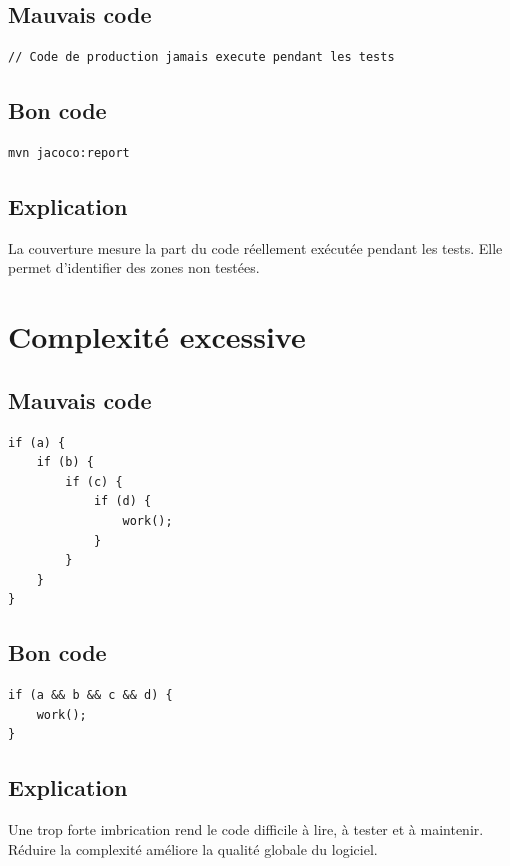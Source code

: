 \documentclass[a4paper,11pt]{report}
\begin{document}
\section{Mauvais code}
\begin{lstlisting}
// Code de production jamais execute pendant les tests
\end{lstlisting}

\section{Bon code}
\begin{lstlisting}[language=bash]
mvn jacoco:report
\end{lstlisting}

\section{Explication}
La couverture mesure la part du code réellement exécutée pendant les tests.
Elle permet d'identifier des zones non testées.

\chapter{Complexité excessive}

\section{Mauvais code}
\begin{lstlisting}
if (a) {
    if (b) {
        if (c) {
            if (d) {
                work();
            }
        }
    }
}
\end{lstlisting}

\section{Bon code}
\begin{lstlisting}
if (a && b && c && d) {
    work();
}
\end{lstlisting}

\section{Explication}
Une trop forte imbrication rend le code difficile à lire, à tester et à maintenir.
Réduire la complexité améliore la qualité globale du logiciel.

\end{document}
